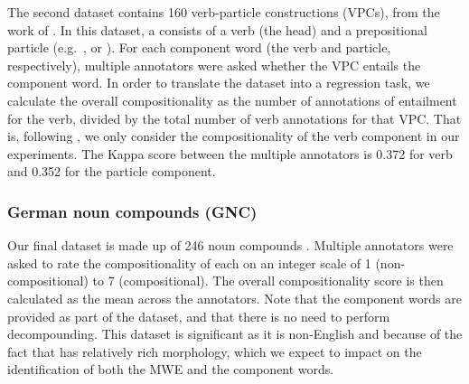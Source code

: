 \documentclass[output=paper
,modfonts
,nonflat]{langsci/langscibook}
\begin{document}
The second dataset contains 160  verb-particle constructions
(VPCs), from the work of \citet{bannard2006}. In this dataset, a 
 consists of a verb (the head) and a
prepositional particle (e.g.\ ,  or
). For each component word (the verb and particle,
respectively), multiple annotators were asked whether the VPC entails
the component word. In order to translate the dataset into a
regression task, we calculate the overall compositionality as the
number of annotations of entailment for the verb, divided by the total
number of verb annotations for that VPC. That is, following
\citet{bannard2003}, we only consider the compositionality of the verb
component in our experiments.
The Kappa score between the multiple annotators is 0.372 for verb and
0.352 for the particle component.
 




\subsubsection{German noun compounds (GNC)}

Our final dataset is made up of 246  noun compounds
\citep{von2009,SchulteImWalde+:2013}. Multiple annotators were asked to rate the
compositionality of each   on an integer scale of 1
(non-compositional) to 7 (compositional). The overall compositionality
score is then calculated as the mean across the annotators. Note that
the component words are provided as part of the dataset, and that
there is no need to perform decompounding. This dataset is significant 
as it is non-English and because of the fact that 
 has relatively rich
morphology, which we expect to impact on the identification of both
the MWE and the component words.
\end{document}
